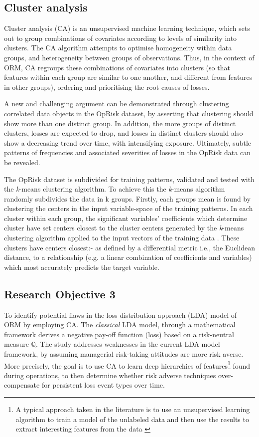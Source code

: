 \documentclass[a4paper]{article}
\begin{document}
\subsection{Cluster analysis}

Cluster analysis (CA) is an unsupervised machine learning technique, which sets out to group combinations of covariates according to levels of similarity into clusters. The CA algorithm attempts to optimise homogeneity within data groups, and heterogeneity between groups of observations. Thus, in the context of ORM, CA regroups these combinations of covariates into clusters (so that features within each group are similar to one another, and different from features in other groups), ordering and prioritising the root causes of losses.\medskip

A new and challenging argument can be demonstrated through clustering correlated data objects in the OpRisk dataset, by asserting that clustering should show more than one distinct group. In addition, the more groups of distinct clusters, losses are expected to drop, and losses in distinct clusters should also show a decreasing trend over time, with intensifying exposure. Ultimately, subtle patterns of frequencies and associated severities of losses in the OpRisk data can be revealed.\medskip  

The OpRisk dataset is subdivided for training patterns, validated and tested with the \emph{k}-means clustering algorithm. To achieve this the \emph{k}-means algorithm randomly subdivides the data in k groups. Firstly, each groups mean is found by clustering the centers in the input variable-space of the training patterns. In each cluster within each group, the significant variables' coefficients which determine cluster have set centers closest to the cluster centers generated by the \emph{k}-means clustering algorithm applied to the input vectors of the training data \citep{flake1998square}. These clusters  have centers closest:- as defined by a differential metric i.e., the Euclidean distance, to a relationship (e.g. a linear combination of coefficients and variables) which most accurately predicts the target variable.

\subsection{Research Objective 3}

To identify potential flaws in the loss distribution approach (LDA) model of ORM by employing CA. The \textit{classical}  LDA model, through a mathematical framework derives a negative pay-off function (loss) based on a risk-neutral measure $\mathbb{Q}$. The study addresses weaknesses in the current LDA model framework, by assuming managerial risk-taking attitudes are more risk averse. More precisely, the goal is to use CA to learn deep hierarchies of features\footnote{A typical approach taken in the literature is to use an unsupervised learning algorithm to train a model of the unlabeled data and then use the results to extract interesting features from the data \citep{coates2012learning}} found during operations, to then determine whether risk adverse techniques over-compensate for persistent loss event types over time. \medskip
\end{document}

